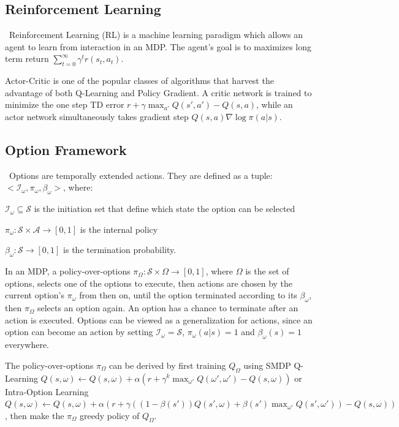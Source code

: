 \documentclass{article}
\begin{document}
	\subsection*{Reinforcement Learning}
	\qquad \ Reinforcement Learning (RL) \cite{sutton2018reinforcement} is a machine learning paradigm which allows an agent to learn from interaction in an MDP. The agent's goal is to maximizes long term return $\sum_{t=0}^{\infty} \gamma^t r(s_t, a_t)$.
	
	\quad Actor-Critic \cite{Konda00actor-criticalgorithms} is one of the popular classes of algorithms that harvest the advantage of both Q-Learning and Policy Gradient. A critic network is trained to minimize the one step TD error $r + \gamma \max_{a'} Q(s',a') - Q(s,a)$, while an actor network simultaneously takes gradient step $Q(s,a) \nabla \log\pi(a|s) $. 
	\subsection*{Option Framework}
	\qquad \ Options \cite{SUTTON1999181} are temporally extended actions. They are defined as a tuple: $<\mathcal{I}_\omega,\pi_\omega,\beta_\omega>$, where:
	
	\qquad $\mathcal{I}_\omega \subseteq \mathcal{S}$ is the initiation set that define which state the option can be selected
	
	\qquad $\pi_\omega : \mathcal{S} \times \mathcal{A} \rightarrow [0,1]$ is the internal policy
	
	\qquad $\beta_\omega:\mathcal{S} \rightarrow [0,1]$ is the termination probability.
	
	\quad In an MDP, a policy-over-options $\pi_\Omega : \mathcal{S} \times \Omega \rightarrow [0,1]$, where $\Omega$ is the set of options, selects one of the options to execute, then actions are chosen by the current option's $\pi_\omega$ from then on, until the option terminated according to its $\beta_\omega$, then $\pi_\Omega$ selects an option again. An option has a chance to terminate after an action is executed. Options can be viewed as a generalization for actions, since an option can become an action by setting $\mathcal{I}_\omega=\mathcal{S}$, $\pi_\omega(a|s)=1$ and $\beta_\omega(s)=1$ everywhere.
	
	\quad The policy-over-options $\pi_\Omega$ can be derived by first training $Q_\Omega$ using SMDP Q-Learning \cite{smdp} $Q(s,\omega)\leftarrow Q(s,\omega) + \alpha(r + \gamma^k \max_{\omega'} Q(\omega',\omega') - Q(s,\omega))$ or Intra-Option Learning \cite{intraoplearn} $Q(s,\omega)\leftarrow Q(s,\omega) + \alpha(r + \gamma ((1-\beta(s'))Q(s',\omega)+\beta(s')\max_{\omega'}Q(s',\omega')) - Q(s,\omega))$, then make the $\pi_\Omega$ greedy policy of $Q_\Omega$.
\end{document}
